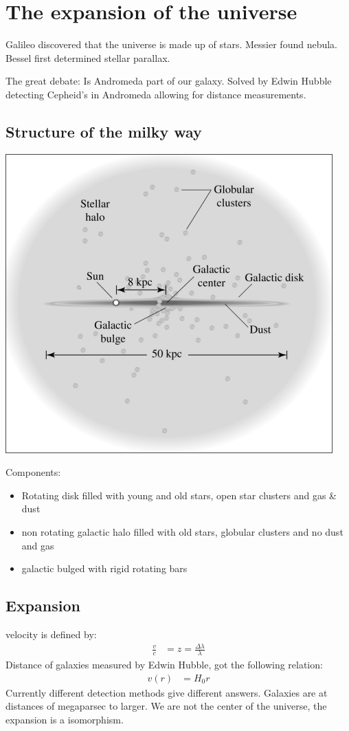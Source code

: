 \documentclass[11pt,a4paper]{article}
\begin{document}
\section{The expansion of the universe}
Galileo discovered that the universe is made up of stars.
Messier found nebula. 
Bessel first determined stellar parallax. 

The great debate: 
Is Andromeda part of our galaxy.
Solved by Edwin Hubble detecting Cepheid's in Andromeda allowing for distance measurements.
\subsection{Structure of the milky way}
\begin{center}
    \includegraphics[width=0.5\linewidth]{screenshot_2024-01-23-105305.png}
\end{center}
Components: 
\begin{itemize}
    \item Rotating disk filled with young and old stars, open star clusters and gas \& dust 
    \item non rotating galactic halo filled with old stars, globular clusters and no dust and gas 
    \item galactic bulged with rigid rotating bars
\end{itemize}
\subsection{Expansion} \label{sec:Expansion}
velocity is defined by: 
\begin{align*}
    \frac v c &= z = \frac {\Delta \lambda} {\lambda} 
\end{align*}
Distance of galaxies measured by Edwin Hubble, got the following relation:
\begin{align*}
    v(r) &= H_0 r 
\end{align*}
Currently different detection methods give different answers. 
Galaxies are at distances of megaparsec to larger.
We are not the center of the universe, the expansion is a isomorphism.
\end{document}
